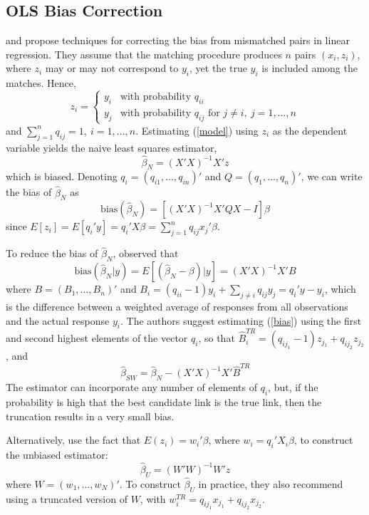 \documentclass[12pt]{article}
\begin{document}
\subsection{OLS Bias Correction}
 \cite{sw1993} and \cite{lahiri05} propose techniques for correcting the bias from mismatched pairs in linear regression.  They assume that the matching procedure produces $n$ pairs $(x_i, z_i)$, where $z_i$ may or may not correspond to $y_i$, yet the true $y_i$ is included among the matches.   Hence, 
$$z_i = \begin{cases} y_i & \text{with probability $q_{ii}$} \\ y_j & \text{with probability $q_{ij}$ for $j\neq i,\ j = 1,\dots,n $} \end{cases}$$ 
and $\sum_{j=1}^n q_{ij} = 1, \ i=1,\dots, n$.  Estimating (\ref{model}) using $z_i$ as the dependent variable yields the naive least squares estimator, 
\begin{equation} \hat{\beta}_N = (X'X)^{-1} X'z \label{naive} \end{equation}
which is biased.   Denoting $q_i = (q_{i1}, \dots, q_{in})'$ and $Q = (q_1, \dots, q_n)'$, we can write the bias of $\hat{\beta}_N $ as
$$\text{bias}(\hat{\beta}_N) = [(X'X)^{-1} X'QX - I] \beta $$ 
 since $E[z_i] = E[q_i'y]  = q_i'X\beta =  \sum_{j=1}^{n} q_{ij} x_j'\beta $.  

To reduce the bias of $\hat{\beta}_N$, \cite{sw1993} observed that 
\begin{equation} \text{bias} (\hat{\beta}_N | y) = E[(\hat{\beta}_N - \beta) | y ] = (X'X)^{-1} X'B \label{bias} \end{equation}
where $B = (B_1, \dots, B_n)'$ and $B_i = (q_{ii}-1)y_i + \sum_{j\neq i } q_{ij} y_j = q_i'y - y_i$, which is the difference between a weighted average of responses from all observations and the actual response $y_i$.  The authors suggest estimating (\ref{bias}) using the first and second highest elements of the vector $q_i$, so that $\hat{B}_i^{TR} = (q_{ij_1} - 1) z_{j_1} + q_{ij_2} z_{j_2}$, and 
\begin{equation} \hat{\beta}_{SW} = \hat{\beta}_N - (X'X)^{-1} X' \hat{B}^{TR} \label{sw}\end{equation}
The estimator can incorporate any number of elements of $q_i$, but, if the probability is high that the best candidate link is the true link, then the truncation  results in a very small bias. 

Alternatively,  \cite{lahiri05} use the fact that $E(z_i) = w_i'\beta$, where $w_i = q_i'X_i\beta$, to construct the unbiased estimator:
$$ \hat{\beta}_U = (W'W)^{-1} W'z$$ 
where $W = (w_1, \dots, w_N)'$.  To construct $\hat{\beta}_U$ in practice, they also recommend using a truncated version of $W$, with $w_i^{TR} = q_{ij_1} x_{j_1} + q_{ij_2} x_{j_2}$.
\end{document}

